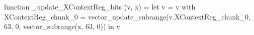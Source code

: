 function _update_XContextReg_bits (v, x) = let v = { v with XContextReg_chunk_0 = vector_update_subrange(v.XContextReg_chunk_0, 63, 0, vector_subrange(x, 63, 0)) } in v
